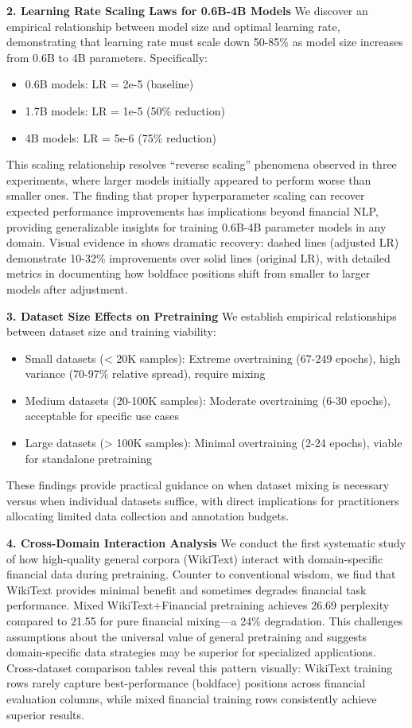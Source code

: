 \textbf{2. Learning Rate Scaling Laws for 0.6B-4B Models}
We discover an empirical relationship between model size and optimal learning rate, demonstrating that learning rate must scale down 50-85\% as model size increases from 0.6B to 4B parameters. Specifically:
\begin{itemize}
    \item 0.6B models: LR = 2e-5 (baseline)
    \item 1.7B models: LR = 1e-5 (50\% reduction)
    \item 4B models: LR = 5e-6 (75\% reduction)
\end{itemize}
This scaling relationship resolves ``reverse scaling'' phenomena observed in three experiments, where larger models initially appeared to perform worse than smaller ones. The finding that proper hyperparameter scaling can recover expected performance improvements has implications beyond financial NLP, providing generalizable insights for training 0.6B-4B parameter models in any domain. Visual evidence in  shows dramatic recovery: dashed lines (adjusted LR) demonstrate 10-32\% improvements over solid lines (original LR), with detailed metrics in  documenting how boldface positions shift from smaller to larger models after adjustment.

\textbf{3. Dataset Size Effects on Pretraining}
We establish empirical relationships between dataset size and training viability:
\begin{itemize}
    \item Small datasets (< 20K samples): Extreme overtraining (67-249 epochs), high variance (70-97\% relative spread), require mixing
    \item Medium datasets (20-100K samples): Moderate overtraining (6-30 epochs), acceptable for specific use cases
    \item Large datasets (> 100K samples): Minimal overtraining (2-24 epochs), viable for standalone pretraining
\end{itemize}
These findings provide practical guidance on when dataset mixing is necessary versus when individual datasets suffice, with direct implications for practitioners allocating limited data collection and annotation budgets.

\textbf{4. Cross-Domain Interaction Analysis}
We conduct the first systematic study of how high-quality general corpora (WikiText) interact with domain-specific financial data during pretraining. Counter to conventional wisdom, we find that WikiText provides minimal benefit and sometimes degrades financial task performance. Mixed WikiText+Financial pretraining achieves 26.69 perplexity compared to 21.55 for pure financial mixing—a 24\% degradation. This challenges assumptions about the universal value of general pretraining and suggests domain-specific data strategies may be superior for specialized applications. Cross-dataset comparison tables reveal this pattern visually: WikiText training rows rarely capture best-performance (boldface) positions across financial evaluation columns, while mixed financial training rows consistently achieve superior results.

